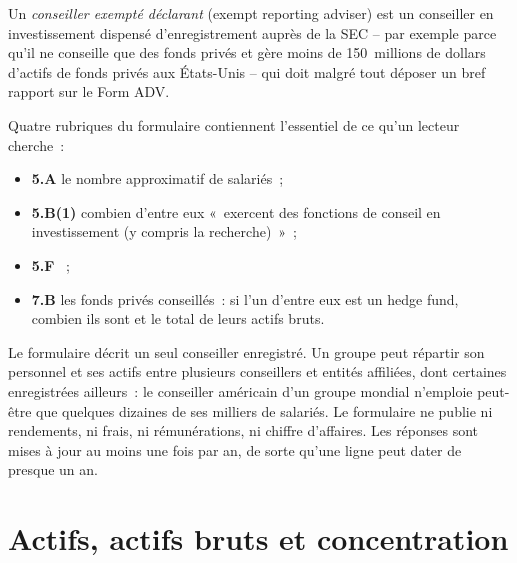\begin{definition}\label{def:in:quantitative-hedge-funds-and-systematic-managers:era}
Un \emph{conseiller exempté déclarant} (exempt reporting adviser) est un conseiller en investissement dispensé d'enregistrement auprès de la SEC --
par exemple parce qu'il ne conseille que des fonds privés et gère moins de 150~millions de dollars d'actifs de fonds privés aux
États-Unis -- qui doit malgré tout déposer un bref rapport sur le Form ADV.
\end{definition}

Quatre rubriques du formulaire contiennent l'essentiel de ce qu'un lecteur cherche~:
\begin{itemize}
\item \textbf{5.A} le nombre approximatif de salariés~;
\item \textbf{5.B(1)} combien d'entre eux «~exercent des fonctions de conseil en investissement (y compris la recherche)~»~;
\item \textbf{5.F} ~;
\item \textbf{7.B} les fonds privés conseillés~: si l'un d'entre eux est un hedge fund, combien ils sont et le total de leurs actifs bruts.
\end{itemize}

\begin{remark}\label{rem:in:quantitative-hedge-funds-and-systematic-managers:limits}
Le formulaire décrit un seul conseiller enregistré. Un groupe peut répartir son personnel et ses actifs entre plusieurs conseillers et
entités affiliées, dont certaines enregistrées ailleurs~: le conseiller américain d'un groupe mondial n'emploie peut-être que quelques dizaines de ses milliers de
salariés. Le formulaire ne publie ni rendements, ni frais, ni rémunérations, ni chiffre d'affaires. Les réponses sont mises à jour
au moins une fois par an, de sorte qu'une ligne peut dater de presque un an.
\end{remark}

\section{Actifs, actifs bruts et concentration}

